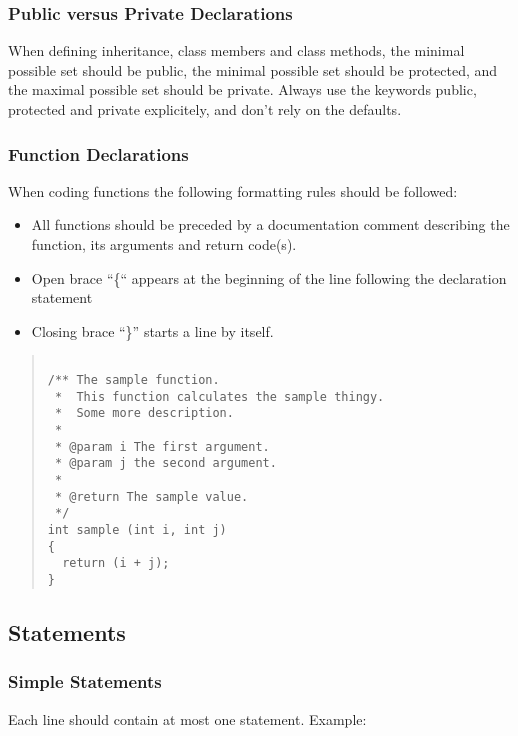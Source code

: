 \documentclass{article}
\begin{document}
\subsubsection{Public versus Private Declarations}

When defining inheritance, class members and class methods, the
minimal possible set should be public, the minimal possible set should
be protected, and the maximal possible set should be private.  Always
use the keywords public, protected and private explicitely, and don't
rely on the defaults.


\subsubsection{Function Declarations}

When coding functions the following formatting rules should be
followed:

\begin{itemize}
\item All functions should be preceded by a documentation comment
      describing the function, its arguments and return code(s).
\item Open brace ``\{`` appears at the beginning of the line following
      the declaration statement  
\item Closing brace ``\}'' starts a line by itself.
\end{itemize}

\begin{quote}
\begin{verbatim}

/** The sample function.
 *  This function calculates the sample thingy.
 *  Some more description.
 *
 * @param i The first argument.
 * @param j the second argument.
 * 
 * @return The sample value.
 */
int sample (int i, int j) 
{
  return (i + j);
}

\end{verbatim}
\end{quote}

\subsection{Statements}
\subsubsection{Simple Statements}

Each line should contain at most one statement. Example: 
\end{document}
